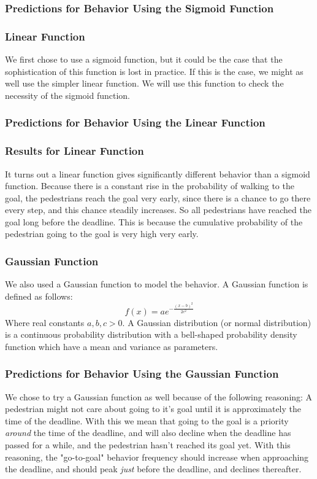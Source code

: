 \documentclass[11pt]{article}
\begin{document}
\subsubsection{Predictions for Behavior Using the Sigmoid Function}


\subsubsection{Linear Function}
We first chose to use a sigmoid function, but it could be the case that the sophistication of this function is lost in practice. If this is the case, we might as well use the simpler linear function. We will use this function to check the necessity of the sigmoid function.

\subsubsection{Predictions for Behavior Using the Linear Function}

\subsubsection{Results for Linear Function}
It turns out a linear function gives significantly different behavior than a sigmoid function. Because there is a constant rise in the probability of walking to the goal, the pedestrians reach the goal very early, since there is a chance to go there every step, and this chance steadily increases. So all pedestrians have reached the goal long before the deadline. This is because the cumulative probability of the pedestrian going to the goal is very high very early.

\subsubsection{Gaussian Function}
We also used a Gaussian function to model the behavior. A Gaussian function is defined as follows:
\begin{equation}f(x) = ae^{- \frac{(x-b)^2}{2c^2}}\end{equation}
Where real constants $a, b, c > 0 $. A Gaussian distribution (or normal distribution) is a continuous probability distribution with a bell-shaped probability density function which have a mean and variance as parameters.


\subsubsection{Predictions for Behavior Using the Gaussian Function}
We chose to try a Gaussian function as well because of the following reasoning: A pedestrian might not care about going to it's goal until it is approximately the time of the deadline. With this we mean that going to the goal is a priority \emph{around} the time of the deadline, and will also decline when the deadline has passed for a while, and the pedestrian hasn't reached its goal yet. With this reasoning, the "go-to-goal" behavior frequency should increase when approaching the deadline, and should peak \emph{just} before the deadline, and declines thereafter.
\end{document}

